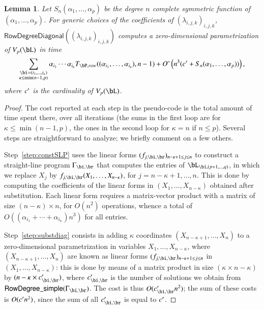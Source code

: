 \documentclass[amsthm]{elsart}
\newtheorem{lemma}[definition]{Lemma}
\begin{document}
\begin{lemma}\label{lemma:rowdegreediagonal}
  Let $S_n(\alpha_1,\dots,\alpha_p)$ be the degree $n$ complete
  symmetric function of $(\alpha_1,\dots,\alpha_p)$. For generic 
  choices of the coefficients of $(\lambda_{i,j,k})_{i,j,k}$,
  $\mathsf{RowDegreeDiagonal}((\lambda_{i,j,k})_{i,j,k})$
  computes a zero-dimensional parametrization of $V_p(\bL)$
  in time $$\sum_{\substack{\bi=(i_1,\dots,i_\kappa)\\ \kappa\le\min(n-1,p)}}
  \alpha_{i_1} \cdots \alpha_{i_\kappa} T_{\bP,{\rm
      row}}((\alpha_{i_1},\dots,\alpha_{i_\kappa}), n-1) + \softO\left (n^3(\rc + S_n(\alpha_1,\dots,\alpha_p))  \right),$$
  where ${c'}{}$ is the cardinality of $V_p(\bL)$.
\end{lemma}
\begin{proof}
  The cost reported at each step in the pseudo-code is the total amount
  of time spent there, over all iterations (the sums in the first loop
  are for $\kappa \le \min(n-1,p)$, the ones in the second loop for
  $\kappa=n$ if $n \le p$). Several steps are straightforward to
  analyze; we briefly comment on a few others.

  Step~\ref{step:constSLP} uses the linear forms
  $(f_{j,\bi,\br})_{n-\kappa+1 \le j \le n}$ to construct a
  straight-line program $\Gamma_{\bi,\br}$ that computes the entries
  of $\bL_{\bi,(p+1, \ldots, q)}$, in which we replace $X_j$ by
  $f_{j,\bi,\br}(X_1, \ldots, X_{n-\kappa})$, for
  $j=n-\kappa+1,\dots,n$.  This is done by computing the coefficients
  of the linear forms in $(X_1,\dots,X_{n-\kappa})$ obtained after
  substitution. Each linear form requires a matrix-vector product with
  a matrix of size $(n-\kappa) \times n$, for $O(n^2)$ operations,
  whence a total of $O((\alpha_{i_1} + \cdots +\alpha_{i_\kappa})n^3)$
  for all entries.

  Step~\ref{step:substdiag} consists in adding $\kappa$ coordinates
  $(X_{n-\kappa+1},\dots,X_n)$ to a zero-dimensional parametrization
  in variables $X_1,\dots,X_{n-\kappa}$, where
  $(X_{n-\kappa+1},\dots,X_n)$ are known as linear forms
  $(f_{j,\bi,\br})_{n-\kappa+1 \le j \le n}$ in $(X_1, \ldots,
  X_{n-\kappa})$: this is done by means of a matrix product in size
  $(\kappa \times n-\kappa)$ by $(n-\kappa \times c'_{\bi,\br})$,
  where $c'_{\bi,\br}$ is the number of solutions we obtain from
  $\mathsf{RowDegree\_simple}(\Gamma_{\bi,\br})$. The cost is thus
  $O(c'_{\bi,\br}n^2 )$; the sum of these costs is $O({c'}{} n^2 )$,
  since the sum of all $c'_{\bi,\br}$ is equal to ${c'}{}$.


\end{proof}
\end{document}
